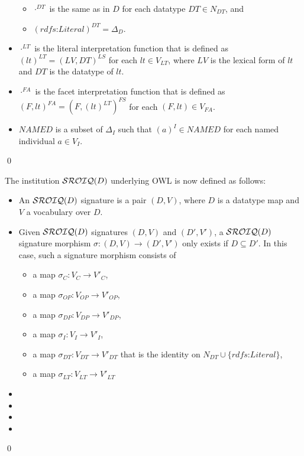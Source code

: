 \documentclass[10pt,fleqn,final]{scrreprt}
\newenvironment{definitions}[0]{\medskip }{}
\begin{document}
\begin{definitions}
\begin{definition}
\begin{itemize}
\begin{itemize}
\item
        $\cdot^{DT}$ is the same as in $D$ for each datatype $DT \in N_{DT}$, and
\item
        $(\textit{rdfs:Literal})^{DT} = \Delta_D$. 
\end{itemize}
\item
    $\cdot^{LT}$ is the literal interpretation function that is defined as $(lt)^{LT} = ( LV , DT )^{LS}$ for each $lt \in V_{LT}$, where $LV$ is the lexical form of $lt$ and $DT$ is the datatype of $lt$.
\item
    $\cdot^{FA}$ is the facet interpretation function that is defined as $( F , lt )^{FA} = ( F , (lt)^{LT} )^{FS}$ for each $( F , lt ) \in V_{FA}$.
\item
    $\mathit{NAMED}$ is a subset of $\Delta_I$ such that $(a)^{I} \in \mathit{NAMED}$ for each named individual $a \in V_{I}$. 
\end{itemize}
\qed\end{definition}

The institution $\mathcal{SROIQ}(D)$ underlying OWL is now defined as follows:
\begin{definition}
\begin{itemize}
\item An $\mathcal{SROIQ}(D)$ signature is a pair $(D,V)$, where $D$ is a
  datatype map and $V$ a vocabulary over $D$.
\item Given $\mathcal{SROIQ}(D)$ signatures $(D,V)$ and $(D',V')$, a
  $\mathcal{SROIQ}(D)$ signature morphism $\sigma\colon (D,V)\to(D',V')$ only
  exists if $D\subseteq D'$. In this case, such a signature morphism
  consists of
\begin{itemize}
\item a map $\sigma_C\colon V_{C}\to V'_{C}$,
\item a map $\sigma_{OP}\colon V_{OP}\to V'_{OP}$,
\item a map $\sigma_{DP}\colon V_{DP}\to V'_{DP}$,
\item a map $\sigma_I\colon V_{I}\to V'_{I}$,
\item a map $\sigma_{DT}\colon V_{DT}\to V'_{DT}$ that is the identity
on $N_{DT} \cup \{ \textit{rdfs:Literal} \}$,
\item a map $\sigma_{LT}\colon V_{LT}\to V'_{LT}$ 

\end{itemize}
\item
\item
\item
\item
\end{itemize}
\qed\end{definition}


\end{definitions}
\end{document}
